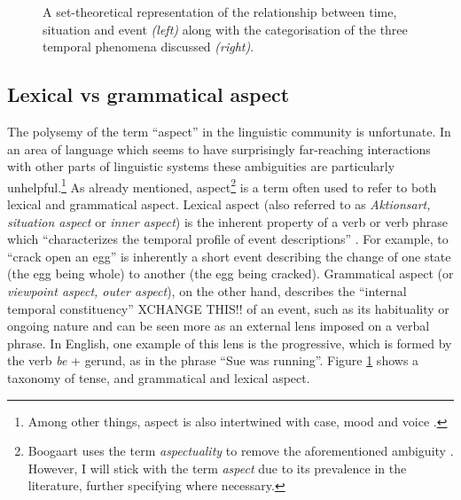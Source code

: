\begin{figure}
    \hspace{2cm}
    \caption{A set-theoretical representation of the relationship between time, situation and event \emph{(left)} along with the categorisation of the three temporal phenomena discussed \emph{(right)}.}
    \label{fig:TimeSitEvent}
\end{figure}

\subsection{Lexical vs grammatical aspect}
The polysemy of the term “aspect” in the linguistic community is unfortunate. In an area of language which seems to have surprisingly far-reaching interactions with other parts of linguistic systems these ambiguities are particularly unhelpful.\footnote{Among other things, aspect is also intertwined with case, mood and voice \citep{franks2005slavic, Kiparsky2004PartitiveCA}.}
As already mentioned, aspect\footnote{Boogaart uses the term \emph{aspectuality} to remove the aforementioned ambiguity \citep{Boogaart+2004+1165+1180}. However, I will stick with the term \emph{aspect} due to its prevalence in the literature, further specifying where necessary.} is a term often used to refer to both lexical and grammatical aspect. Lexical aspect (also referred to as \emph{Aktionsart, situation aspect} or \emph{inner aspect}) is the inherent property of a verb or verb phrase which “characterizes the temporal profile of event descriptions” \citep{10.1093/oxfordhb/9780199601264.013.25}. For example, to “crack open an egg” is inherently a short event describing the change of one state (the egg being whole) to another (the egg being cracked). Grammatical aspect (or \emph{viewpoint aspect, outer aspect}), on the other hand, describes the “internal temporal constituency” \citep{comrie1976aspect} XCHANGE THIS!! of an event, such as its habituality or ongoing nature and can be seen more as an external lens imposed on a verbal phrase. In English, one example of this lens is the progressive, which is formed by the verb \emph{be} + gerund, as in the phrase “Sue was running”. Figure \ref{fig:TimeSitEvent} shows a taxonomy of tense, and grammatical and lexical aspect.

